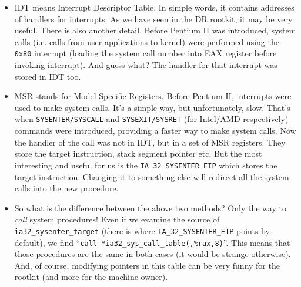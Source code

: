 \documentclass[12pt]{article}
\begin{document}
  \begin{itemize}
    \item IDT means Interrupt Descriptor Table. In simple words, it contains
      addresses of handlers for interrupts. As we have seen in the DR rootkit,
      it may be very useful. There is also another detail.  Before Pentium II
      was introduced, system calls (i.e. calls from user applications to
      kernel) were performed using the \verb!0x80!  interrupt (loading the
      system call number into EAX register before invoking interrupt). And
      guess what? The handler for that interrupt was stored in IDT too.

    \item MSR stands for Model Specific Registers. Before Pentium II,
      interrupts were used to make system calls. It's a simple way, but
      unfortunately, slow. That's when \verb!SYSENTER/SYSCALL! and
      \verb!SYSEXIT/SYSRET! (for Intel/AMD respectively) commands were
      introduced, providing a faster way to make system calls. Now the handler
      of the call was not in IDT, but in a set of MSR registers. They store
      the target instruction, stack segment pointer etc. But the most
      interesting and useful for us is the \verb!IA_32_SYSENTER_EIP! which
      stores the target instruction. Changing it to something else will
      redirect all the system calls into the new procedure.

    \item So what is the difference between the above two methods? Only the
      way to \emph{call} system procedures! Even if we examine the source of
      \verb!ia32_sysenter_target! (there is where \verb!IA_32_SYSENTER_EIP!
  points by default), we find
  ``\verb!call *ia32_sys_call_table(,%rax,8)!''. This means that those
  procedures are the same in both cases (it would be strange otherwise). And,
  of course, modifying pointers in this table can be very funny for the
  rootkit (and more for the machine owner).
  \end{itemize}
\end{document}
